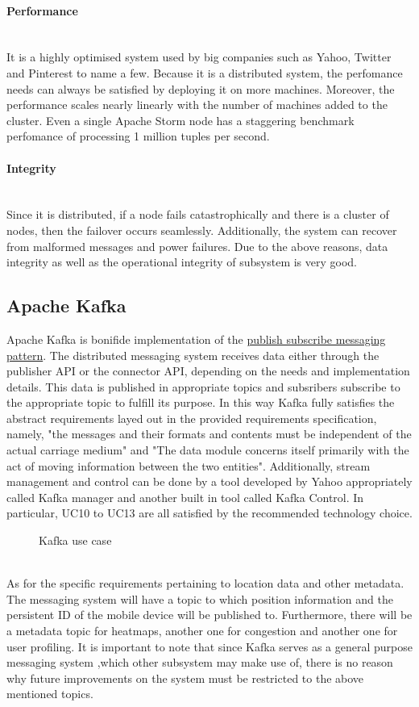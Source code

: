 \paragraph{Performance}
\mbox{}\\
It is a highly optimised system used by big companies such as Yahoo, Twitter and Pinterest to name a few. Because it is a distributed system, the perfomance needs can always be satisfied by deploying it on more machines. Moreover, the performance scales nearly linearly with the number of machines added to the cluster. Even a single Apache Storm node has a staggering benchmark perfomance of processing 1 million tuples per second.
\paragraph{Integrity}
\mbox{}\\
Since it is distributed, if a node fails catastrophically and there is a cluster of nodes, then the failover occurs seamlessly. Additionally, the system can recover from malformed messages and power failures. Due to the above reasons, data integrity as well as the operational integrity of subsystem is very good.

\subsection{Apache Kafka}
Apache Kafka is bonifide implementation of the \underline{publish subscribe messaging pattern}.
The distributed messaging system receives data either through the publisher API or the connector API, depending on the needs and implementation details. This data is published in appropriate topics and subsribers subscribe to the appropriate topic to fulfill its purpose. In this way Kafka fully satisfies the abstract requirements layed out in the provided requirements specification, namely, "the messages and their formats and contents must be independent of the actual carriage medium" and "The data module concerns itself primarily with the act of moving information between the two entities". Additionally, stream management and control can be done by a tool developed by Yahoo appropriately called Kafka manager and another built in tool called Kafka Control. In particular, UC10 to UC13 are all satisfied by the recommended technology choice.\par
\bigskip
\noindent
\begin{figure}[h]
\caption{Kafka use case}
\end{figure}
\mbox{}\\
\noindent
As for the specific requirements pertaining to location data and other metadata. The messaging system will have a topic to which position information and the persistent ID of the mobile device will be published to. Furthermore, there will be a metadata topic for heatmaps, another one for congestion and another one for user profiling.
It is important to note that since Kafka serves as a general purpose messaging system ,which other subsystem may make use of, there is no reason why future improvements on the system must be restricted to the above mentioned topics.

